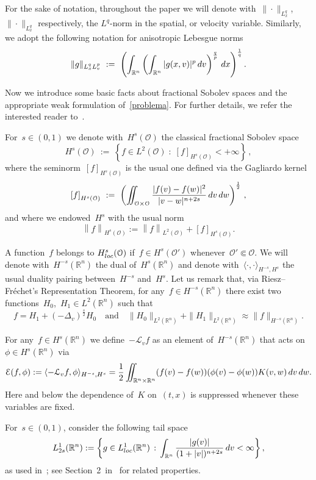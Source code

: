 \documentclass[leqno,10pt]{amsart}
\theoremstyle{plain}
\theoremstyle{remark}
\numberwithin{equation}{section}
\def\dx{\,{\rm d}x}
\def\dv{\,{\rm d}v}
\def\dw{\,{\rm d}w}
\def\ern{\mathbb{R}^n}
\newcommand{\Ec}{\mathcal{E}}
\newcommand{\Lc}{\mathcal{L}_v}
\newcommand{\Oc}{\mathcal{O}}
\newcommand{\norma}[1]{{\left\|#1\right\|}}
\newcommand{\snr}[1]{\lvert #1\rvert}
\begin{document}
{For the sake of notation, throughout the paper we will denote with~$\|\cdot\|_{L^q_x}$,~$\|\cdot\|_{L^q_v}$ respectively, the $L^q$-norm in the spatial, or velocity variable. Similarly, we adopt the following notation for anisotropic Lebesgue norms
\[
\|g\|_{L^{q}_xL^{p}_v} \ : = \ \left(\int_{\ern}\left(\int_{\ern}|g(x,v)|^p\dv\right)^\frac{q}{p}\dx\right)^\frac{1}{q}.
\]

\medskip
Now we introduce some basic facts about fractional Sobolev spaces and the appropriate weak formulation of~\eqref{problema}. For further details, we refer the interested reader to~\cite{DPV12,AN26}.

 For~$s\in (0,1)$ we denote with~$H^s(\Oc)$ the classical fractional Sobolev space
\[
H^s(\Oc) \ := \ \left\{f \in L^2(\Oc) \; : \; \left[ f \right]_{H^s(\Oc)}  < +\infty \right\}\,,
\]
where the seminorm~$\left[ f \right]_{H^s(\Oc)} $ is the usual one defined via the Gagliardo kernel
\[
\left[ f \right]_{H^s(\Oc)}  \ :=  \ \left(\iint_{\Oc\times\Oc} \frac{\snr{f(v)-f(w)}^2}{\snr{v-w}^{n+2s}} \dv\dw\right)^\frac{1}{2}\,,
\]
and where we endowed~$H^s$ with the usual norm
\[ 
\norma{f}_{H^s(\Oc)} := \norma{f}_{L^2(\Oc)} + \left[ f \right]_{H^s(\Oc)} .
\]

A function~$ f$ belongs to $H_{\rm loc}^{s}(\Oc)$ if~$f\in H^s(\Oc')$ whenever~$\Oc' \Subset \Oc$. We will denote with~$H^{-s}(\ern)$ the dual of~$H^s(\ern)$ and denote with~$\langle \cdot,\cdot \rangle_{H^{-s},H^s}$ the usual duality pairing between~$H^{-s}$ and~$H^s$. Let us remark that, via Riesz--Fr\'echet's Representation Theorem, for any~$f \in H^{-s}(\ern)$ there exist two functions~$H_0$,~$H_1 \in L^2(\ern)$ such that
\begin{equation} \label{eq:repr}
f = H_1 + (-\Delta_v)^\frac{s}{2}H_{0}\quad \text{and} \quad \|H_{0}\|_{L^2(\ern)} + \|H_1\|_{L^2(\ern)} \approx \|f\|_{H^{-s}(\ern)}.
\end{equation}

For any~$f \in H^s(\ern)$ we define~$-\Lc f$ as an element of~$H^{-s}(\ern)$ that acts on~$\phi \in H^s(\ern)$ via
\[
\Ec(f,\phi):=\langle -\Lc f ,\phi \rangle_{H^{-s},H^s} = \frac{1}{2} \iint_{\ern\times\ern}(f(v)-f(w))(\phi(v)-\phi(w)) K(v,w)\dv\dw.
\]
Here and below the dependence of~$K$ on~$(t,x)$ is suppressed whenever these variables are fixed.

For~$s\in (0,1)$, consider the following  tail space
\[
L^1_{2s}(\ern):= \left\{g \in L^1_{\rm{loc}}(\ern)\, : \,  \int_{\ern}\frac{|g(v)|}{(1+\snr{v})^{n+2s}}\dv < \infty \right\},
\]
as used in~\cite{KKP16}; see Section~2~in~\cite{KKP17} for related properties.
 
}
\end{document}

